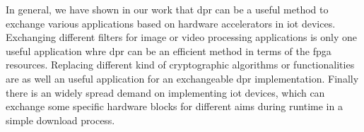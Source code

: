 In general, we have shown in our work that \gls{dpr} can be a useful method to exchange various applications based on hardware accelerators in \gls{iot} devices. Exchanging different filters for image or video processing applications is only one useful application whre \gls{dpr} can be an efficient method in terms of the \gls{fpga} resources.  Replacing different kind of cryptographic algorithms or functionalities are as well an useful application for an exchangeable \gls{dpr} implementation. Finally there is an widely spread demand on implementing \gls{iot} devices, which can exchange some specific hardware blocks for different aims during runtime in a simple download process.